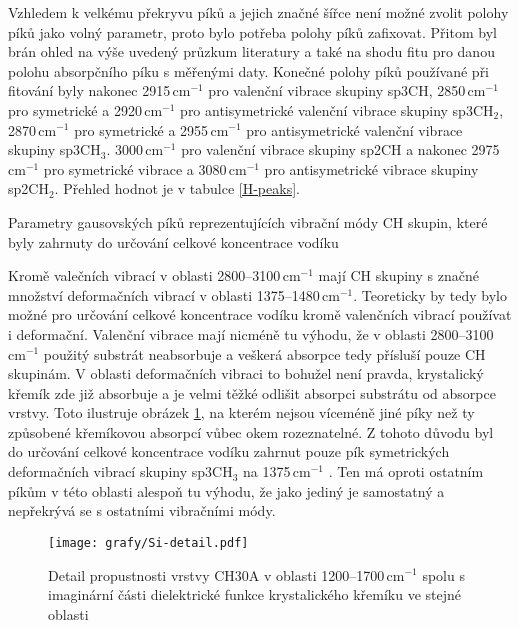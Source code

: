 Vzhledem k velkému překryvu píků a jejich značné šířce není možné zvolit polohy píků jako volný parametr, proto bylo potřeba polohy píků zafixovat. Přitom byl brán ohled na výše uvedený průzkum literatury a také na shodu fitu pro danou polohu absorpčního píku s měřenými daty. 
Konečné polohy píků používané při fitování byly nakonec 2915\,cm$^{-1}$ pro valenční vibrace skupiny sp3CH, 2850\,cm$^{-1}$ pro symetrické a 2920\,cm$^{-1}$ pro antisymetrické valenční vibrace skupiny sp3CH$_2$, 2870\,cm$^{-1}$ pro symetrické a 2955\,cm$^{-1}$ pro antisymetrické valenční vibrace skupiny sp3CH$_3$. 3000\,cm$^{-1}$ pro valenční vibrace skupiny sp2CH a nakonec 2975\,cm$^{-1}$ pro symetrické vibrace a 3080\,cm$^{-1}$ pro antisymetrické vibrace skupiny sp2CH$_2$. Přehled hodnot je v tabulce \ref{H-peaks}.

\begin{table}[tb]
 \centering
	\renewcommand{\tabcolsep}{2pt}
 
 \caption{Parametry gausovských píků reprezentujících vibrační módy CH skupin, které byly zahrnuty do určování celkové koncentrace vodíku}
\label{H-peaks}
\end{table}

Kromě valečních vibrací v oblasti 2800--3100\,cm$^{-1}$ mají CH skupiny s značné množství deformačních vibrací v oblasti 1375--1480\,cm$^{-1}$. Teoreticky by tedy bylo možné pro určování celkové koncentrace vodíku kromě valenčních vibrací používat i deformační. Valenční vibrace mají nicméně tu výhodu, že v oblasti 2800--3100\,cm$^{-1}$ použitý substrát neabsorbuje a veškerá absorpce tedy přísluší pouze CH skupinám. 
V oblasti deformačních vibraci to bohužel není pravda, krystalický křemík zde již absorbuje a je velmi těžké odlišit absorpci substrátu od absorpce vrstvy. Toto ilustruje obrázek \ref{Si-detail}, na kterém nejsou víceméně jiné píky než ty způsobené křemíkovou absorpcí vůbec okem rozeznatelné. Z tohoto důvodu byl do určování celkové koncentrace vodíku zahrnut pouze pík symetrických deformačních vibrací skupiny sp3CH$_3$ na 1375\,cm$^{-1}$ \cite{Robertson2002}. Ten má oproti ostatním píkům v této oblasti alespoň tu výhodu, že jako jediný je samostatný a nepřekrývá se s ostatními vibračními módy.

\begin{figure}[tb]
	\texttt{[image: grafy/Si-detail.pdf]}
	\caption{Detail propustnosti vrstvy CH30A v oblasti 1200--1700\,cm$^{-1}$ spolu s ima\-gi\-nární části dielektrické funkce krystalického křemíku ve stejné oblasti}
	\label{Si-detail}
\end{figure}

